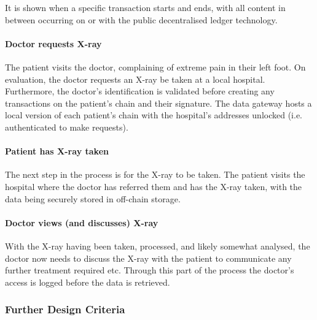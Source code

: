 It is shown when a specific transaction starts and ends, with all content in between occurring on or with the public decentralised ledger technology.

\vfill

\paragraph{Doctor requests X-ray}

The patient visits the doctor, complaining of extreme pain in their left foot. On evaluation, the doctor requests an X-ray be taken at a local hospital. Furthermore, the doctor's identification is validated before creating any transactions on the patient's chain and their signature. The data gateway hosts a local version of each patient's chain with the hospital's addresses unlocked (i.e. authenticated to make requests).





\vfill

\paragraph{Patient has X-ray taken}

The next step in the process is for the X-ray to be taken. The patient visits the hospital where the doctor has referred them and has the X-ray taken, with the data being securely stored in off-chain storage.



\vfill

\paragraph{Doctor views (and discusses) X-ray}

With the X-ray having been taken, processed, and likely somewhat analysed, the doctor now needs to discuss the X-ray with the patient to communicate any further treatment required etc. Through this part of the process the doctor's access is logged before the data is retrieved.



\subsubsection{Further Design Criteria}

